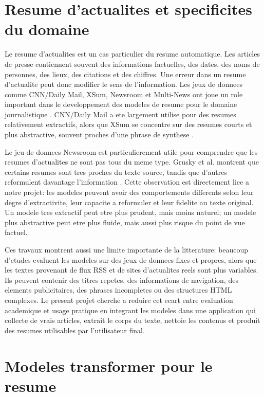 \section{Resume d'actualites et specificites du domaine}

Le resume d'actualites est un cas particulier du resume automatique. Les articles de presse contiennent souvent des informations factuelles, des dates, des noms de personnes, des lieux, des citations et des chiffres. Une erreur dans un resume d'actualite peut donc modifier le sens de l'information. Les jeux de donnees comme CNN/Daily Mail, XSum, Newsroom et Multi-News ont joue un role important dans le developpement des modeles de resume pour le domaine journalistique \cite{Hermann2015Teaching,Narayan2018XSum,Grusky2018Newsroom,Fabbri2019MultiNews}. CNN/Daily Mail a ete largement utilise pour des resumes relativement extractifs, alors que XSum se concentre sur des resumes courts et plus abstractive, souvent proches d'une phrase de synthese \cite{Narayan2018XSum}.

Le jeu de donnees Newsroom est particulierement utile pour comprendre que les resumes d'actualites ne sont pas tous du meme type. Grusky et al. montrent que certains resumes sont tres proches du texte source, tandis que d'autres reformulent davantage l'information \cite{Grusky2018Newsroom}. Cette observation est directement liee a notre projet: les modeles peuvent avoir des comportements differents selon leur degre d'extractivite, leur capacite a reformuler et leur fidelite au texte original. Un modele tres extractif peut etre plus prudent, mais moins naturel; un modele plus abstractive peut etre plus fluide, mais aussi plus risque du point de vue factuel.

Ces travaux montrent aussi une limite importante de la litterature: beaucoup d'etudes evaluent les modeles sur des jeux de donnees fixes et propres, alors que les textes provenant de flux RSS et de sites d'actualites reels sont plus variables. Ils peuvent contenir des titres repetes, des informations de navigation, des elements publicitaires, des phrases incompletes ou des structures HTML complexes. Le present projet cherche a reduire cet ecart entre evaluation academique et usage pratique en integrant les modeles dans une application qui collecte de vrais articles, extrait le corps du texte, nettoie les contenus et produit des resumes utilisables par l'utilisateur final.

\section{Modeles transformer pour le resume}

